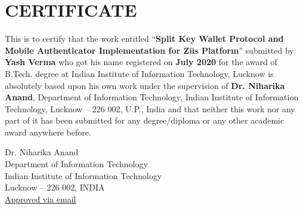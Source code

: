 \chapter*{CERTIFICATE}
This is to certify that the work entitled ``\textbf{Split Key Wallet Protocol and Mobile Authenticator Implementation for Züs Platform}'' submitted by \textbf{Yash Verma} who got his name registered on \textbf{July 2020} for the award of B.Tech.
degree at Indian Institute of Information Technology, Lucknow is absolutely based upon his own work under the supervision of \textbf{Dr. Niharika Anand}, Department of Information Technology, Indian Institute of Information Technology, Lucknow -- 226 002, U.P., India and that neither this work nor any part of it has been submitted for any degree/diploma or any other academic award anywhere before.
\vspace{4cm}
\begin{center}
Dr. Niharika Anand\\
Department of Information Technology\\
Indian Institute of Information Technology\\
Lucknow -- 226 002, INDIA \\
    \href{https://drive.google.com/file/d/1ooxhXnMiOk9xm-MA1lCJ4f5P1pAMNszU/view?usp=sharing}{Approved via email}
\end{center}

